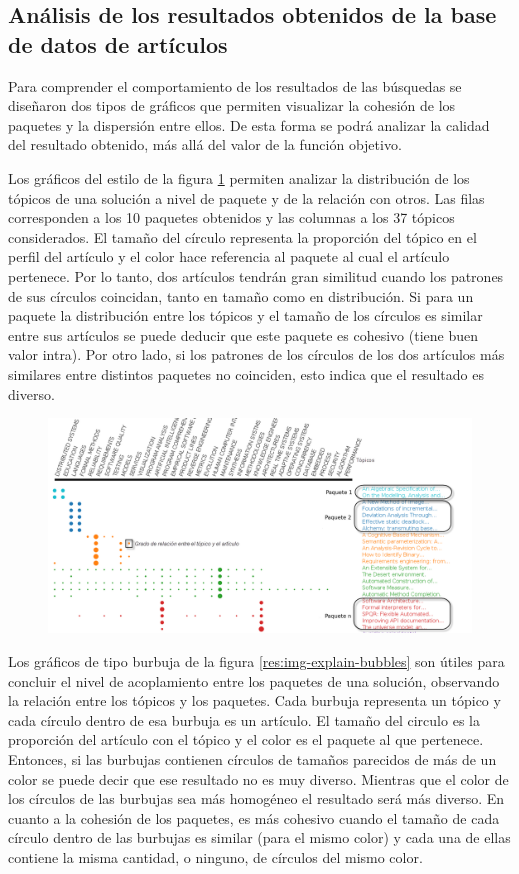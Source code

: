 \subsection{Análisis de los resultados obtenidos de la base de datos de artículos}
Para comprender el comportamiento de los resultados de las búsquedas se diseñaron dos tipos de gráficos que permiten visualizar la cohesión de los paquetes y la dispersión entre ellos. De esta forma se podrá analizar la calidad del resultado obtenido, más allá del valor de la función objetivo.

Los gráficos del estilo de la figura \ref{res:img-explain-bars} permiten analizar la distribución de los tópicos de una solución a nivel de paquete y de la relación con otros. Las filas corresponden a los 10 paquetes obtenidos y las columnas a los 37 tópicos considerados. El tamaño del círculo representa la proporción del tópico en el perfil del artículo y el color hace referencia al paquete al cual el artículo pertenece. Por lo tanto, dos artículos tendrán gran similitud cuando los patrones de sus círculos coincidan, tanto en tamaño como en distribución. Si para un paquete la distribución entre los tópicos y el tamaño de los círculos es similar entre sus artículos se puede deducir que este paquete es cohesivo (tiene buen valor intra). Por otro lado, si los patrones de los círculos de los dos artículos más similares entre distintos paquetes no coinciden, esto indica que el resultado es diverso.
\begin{figure}[H]
  \centering
    \includegraphics[width=1\textwidth]{img/explain-bars.png}
  \caption{}
  \label{res:img-explain-bars}
\end{figure}

Los gráficos de tipo burbuja de la figura \ref{res:img-explain-bubbles} son útiles para concluir el nivel de acoplamiento entre los paquetes de una solución, observando la relación entre los tópicos y los paquetes. Cada burbuja representa un tópico y cada círculo dentro de esa burbuja es un artículo. El tamaño del circulo es la proporción del artículo con el tópico y el color es el paquete al que pertenece. Entonces, si las burbujas contienen círculos de tamaños parecidos de más de un color se puede decir que ese resultado no es muy diverso. Mientras que el color de los círculos de las burbujas sea más homogéneo el resultado será más diverso. En cuanto a la cohesión de los paquetes, es más cohesivo cuando el tamaño de cada círculo dentro de las burbujas es similar (para el mismo color) y cada una de ellas contiene la misma cantidad, o ninguno, de círculos del mismo color.

